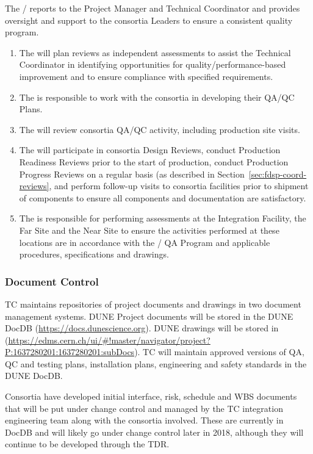 The /  reports
to the  Project Manager and  Technical
Coordinator and provides oversight and support to the consortia
Leaders to ensure a consistent quality program.
\begin{enumerate}
  \item The  will plan reviews as independent assessments to assist
    the  Technical Coordinator in identifying opportunities for
    quality/performance-based improvement and to ensure compliance
    with specified requirements.
  \item The  is responsible to work with the consortia in
    developing their QA/QC Plans.
  \item The  will review consortia QA/QC activity, including
    production site visits.
  \item The  will participate in consortia Design Reviews, conduct
    Production Readiness Reviews prior to the start of production,
    conduct Production Progress Reviews on a regular basis (as
    described in Section~\ref{sec:fdsp-coord-reviews}, and perform
    follow-up visits to consortia facilities prior to shipment of
    components to ensure all components and documentation are
    satisfactory.
\item The  is responsible for performing assessments at the
  Integration Facility, the Far Site and the Near Site to
  ensure the activities performed at these locations are in accordance
  with the / QA Program and applicable procedures,
  specifications and drawings.
\end{enumerate}

\subsubsection{Document Control}
\label{sec:fdsp-coord-document}

TC maintains repositories of project documents and drawings in two
document management systems.  DUNE Project documents will be stored in
the DUNE DocDB (\url{https://docs.dunescience.org}). DUNE drawings
will be stored in 
(\url{https://edms.cern.ch/ui/#!master/navigator/project?P:1637280201:1637280201:subDocs}).
TC will maintain approved versions of QA, QC and testing plans,
installation plans, engineering and safety standards in the DUNE
DocDB.

Consortia have developed initial interface, risk, schedule and WBS
documents that will be put under change control and managed by the TC
integration engineering team along with the consortia involved. These
are currently in DocDB and will likely go under change control later
in 2018, although they will continue to be developed through the TDR.

